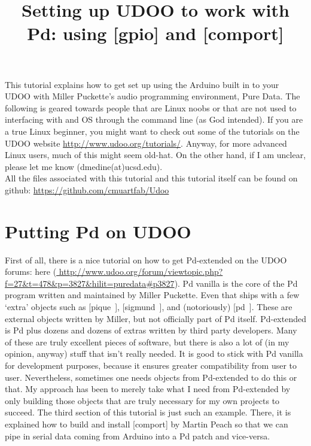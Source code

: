 \documentclass{article}
\begin{document}
\title{Setting up UDOO to work with Pd: using [gpio] and [comport]}
\maketitle
This tutorial explains how to get set up using the Arduino built in to your UDOO with Miller Puckette's audio programming environment, Pure Data. The following is geared towards people that are Linux noobs or that are not used to interfacing with and OS through the command line (as God intended). If you are a true Linux beginner, you might want to check out some of the tutorials on the UDOO website \url{http://www.udoo.org/tutorials/}. Anyway, for more advanced Linux users, much of this might seem old-hat. On the other hand, if I am unclear, please let me know (dmedine(at)ucsd.edu).\\

All the files associated with this tutorial and this tutorial itself can be found on github: \url{https://github.com/cmuartfab/Udoo}\\

\section{Putting Pd on UDOO}
First of all, there is a nice tutorial on how to get Pd-extended on the UDOO forums: here (\url{
http://www.udoo.org/forum/viewtopic.php?f=27\&t=478\&p=3827\&hilit=puredata#p3827}). Pd vanilla is the core of the Pd program written and maintained by Miller Puckette. Even that ships with a few `extra' objects such as [pique~], [sigmund~], and (notoriously) [pd~]. These are external objects written by Miller, but not officially part of Pd itself. Pd-extended is Pd plus dozens and dozens of extras written by third party developers. Many of these are truly excellent pieces of software, but there is also a lot of (in my opinion, anyway) stuff that isn't really needed. It is good to stick with Pd vanilla for development purposes, because it ensures greater compatibility from user to user. Nevertheless, sometimes one needs objects from Pd-extended to do this or that. My approach has been to merely take what I need from Pd-extended by only building those objects that are truly necessary for my own projects to succeed. The third section of this tutorial is just such an example. There, it is explained how to build and install [comport] by Martin Peach so that we can pipe in serial data coming from Arduino into a Pd patch and vice-versa.\\ 
\end{document}
